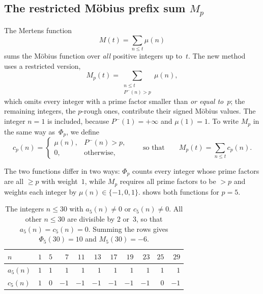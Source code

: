 \documentclass[11pt,a4paper]{amsart}
\numberwithin{equation}{section}
\newcommand{\Pminus}{P^{-}}
\begin{document}
\subsection{The restricted M\"obius prefix sum \texorpdfstring{$M_p$}{Mp}}
The Mertens function
\begin{equation}\label{eq:Mertens}
  M(t)=\sum_{n\le t}\mu(n)
\end{equation}
sums the M\"obius function over \emph{all} positive integers up to~$t$. The new
method uses a restricted version,
\begin{equation}\label{eq:Mp}
  M_p(t)=\sum_{\substack{n\le t\\ \Pminus(n)>p}}\mu(n),
\end{equation}
which omits every integer with a prime factor smaller than \emph{or equal
to}~$p$; the remaining integers, the $p$-rough ones, contribute their signed
M\"obius values. The integer $n=1$ is included, because $\Pminus(1)=+\infty$ and
$\mu(1)=1$. To write $M_p$ in the same way as~$\Phi_p$, we define
\begin{equation}\label{eq:c}
  c_p(n)=\begin{cases}\mu(n), & \Pminus(n)>p,\\ 0, & \text{otherwise},\end{cases}
  \qquad\text{so that}\qquad
  M_p(t)=\sum_{n\le t}c_p(n).
\end{equation}

The two functions differ in two ways: $\Phi_p$ counts every integer whose
prime factors are all $\ge p$ with weight~$1$, while $M_p$ requires all prime
factors to be $>p$ and weights each integer by $\mu(n)\in\{-1,0,1\}$.
 shows both functions for $p=5$.

\begin{table}[htb]
\caption{The integers $n\le30$ with $a_5(n)\ne0$ or $c_5(n)\ne0$. All other
$n\le30$ are divisible by $2$ or~$3$, so that $a_5(n)=c_5(n)=0$. Summing the
rows gives $\Phi_5(30)=10$ and $M_5(30)=-6$.}\label{tab:values}
\centering
\begin{tabular}{@{}lrrrrrrrrrr@{}}
\toprule
$n$ & $1$ & $5$ & $7$ & $11$ & $13$ & $17$ & $19$ & $23$ & $25$ & $29$\\
\midrule
$a_5(n)$ & $1$ & $1$ & $1$ & $1$ & $1$ & $1$ & $1$ & $1$ & $1$ & $1$\\
$c_5(n)$ & $1$ & $0$ & $-1$ & $-1$ & $-1$ & $-1$ & $-1$ & $-1$ & $0$ & $-1$\\
\bottomrule
\end{tabular}
\end{table}
\end{document}
